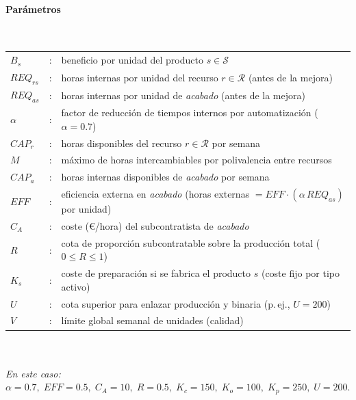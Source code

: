 \paragraph{Parámetros}\mbox{}\\
\begin{tabular}{l c l}
    $B_s$              & : & beneficio por unidad del producto $s \in \mathcal{S}$ \\
    $REQ_{rs}$         & : & horas internas por unidad del recurso $r \in \mathcal{R}$ (antes de la mejora) \\
    $REQ_{a s}$        & : & horas internas por unidad de \textit{acabado} (antes de la mejora) \\
    $\alpha$           & : & factor de reducción de tiempos internos por automatización ($\alpha=0.7$) \\
    $CAP_r$            & : & horas disponibles del recurso $r \in \mathcal{R}$ por semana \\
    $M$                & : & máximo de horas intercambiables por polivalencia entre recursos \\
    $CAP_a$            & : & horas internas disponibles de \textit{acabado} por semana \\
    $EFF$              & : & eficiencia externa en \textit{acabado} (horas externas $=EFF\cdot (\alpha\,REQ_{a s})$ por unidad) \\
    $C_A$              & : & coste (€/hora) del subcontratista de \textit{acabado} \\
    $R$                & : & cota de proporción subcontratable sobre la producción total ($0\le R\le 1$) \\
    $K_s$              & : & coste de preparación si se fabrica el producto $s$ (coste fijo por tipo activo) \\
    $U$                & : & cota superior para enlazar producción y binaria (p.\,ej., $U=200$) \\
    $V$                & : & límite global semanal de unidades (calidad) \\
\end{tabular}
\\
\\
\textit{En este caso: } $\alpha{=}0.7,\; EFF{=}0.5,\; C_A{=}10,\; R{=}0.5,\; K_c{=}150,\; K_o{=}100,\; K_p{=}250,\; U{=}200.$
\\
\\

